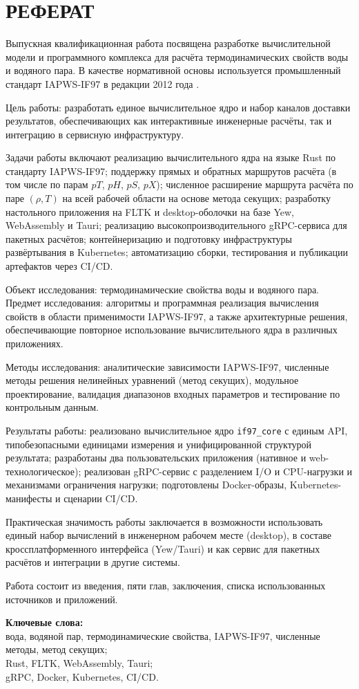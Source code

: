 \clearpage
\chapter*{РЕФЕРАТ}
Выпускная квалификационная работа посвящена разработке вычислительной модели и программного комплекса для расчёта термодинамических свойств воды и водяного пара.
В качестве нормативной основы используется промышленный стандарт IAPWS-IF97 в редакции 2012 года \cite{iapws_if97_2012}.

Цель работы: разработать единое вычислительное ядро и набор каналов доставки результатов, обеспечивающих как интерактивные инженерные расчёты, так и интеграцию в сервисную инфраструктуру.

Задачи работы включают реализацию вычислительного ядра на языке Rust по стандарту IAPWS-IF97; поддержку прямых и обратных маршрутов расчёта (в том числе по парам $pT$, $pH$, $pS$, $pX$); численное расширение маршрута расчёта по паре $(\rho, T)$ на всей рабочей области на основе метода секущих; разработку настольного приложения на FLTK и desktop-оболочки на базе Yew, WebAssembly и Tauri; реализацию высокопроизводительного gRPC-сервиса для пакетных расчётов; контейнеризацию и подготовку инфраструктуры развёртывания в Kubernetes; автоматизацию сборки, тестирования и публикации артефактов через CI/CD.

Объект исследования: термодинамические свойства воды и водяного пара.
Предмет исследования: алгоритмы и программная реализация вычисления свойств в области применимости IAPWS-IF97, а также архитектурные решения, обеспечивающие повторное использование вычислительного ядра в различных приложениях.

Методы исследования: аналитические зависимости IAPWS-IF97, численные методы решения нелинейных уравнений (метод секущих), модульное проектирование, валидация диапазонов входных параметров и тестирование по контрольным данным.

Результаты работы: реализовано вычислительное ядро \texttt{if97\_core} с единым API, типобезопасными единицами измерения и унифицированной структурой результата; разработаны два пользовательских приложения (нативное и web-технологическое); реализован gRPC-сервис с разделением I/O и CPU-нагрузки и механизмами ограничения нагрузки; подготовлены Docker-образы, Kubernetes-манифесты и сценарии CI/CD.

Практическая значимость работы заключается в возможности использовать единый набор вычислений в инженерном рабочем месте (desktop), в составе кроссплатформенного интерфейса (Yew/Tauri) и как сервис для пакетных расчётов и интеграции в другие системы.

Работа состоит из введения, пяти глав, заключения, списка использованных источников и приложений.

\textbf{Ключевые слова:}\\
вода, водяной пар, термодинамические свойства, IAPWS-IF97, численные методы, метод секущих;\\
Rust, FLTK, WebAssembly, Tauri;\\
gRPC, Docker, Kubernetes, CI/CD.
